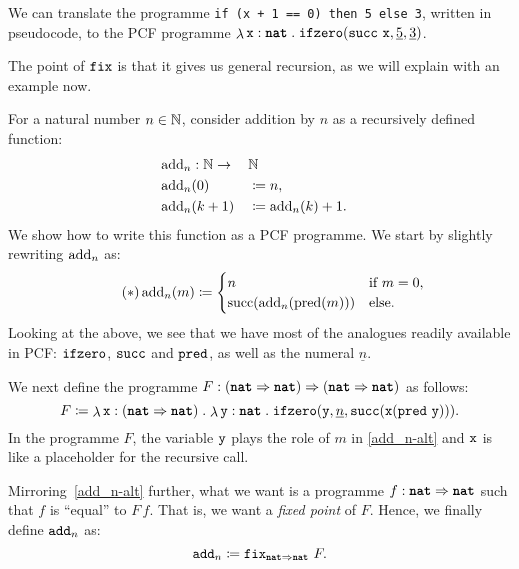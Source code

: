 \begin{example}\label{exam:ifzero}
  We can translate the programme \verb|if (x + 1 == 0) then 5 else 3|, written in
  pseudocode, to the PCF programme
  \(\lambdadot{\var x : \pcfnat}{\pcfifz(\pcfsuc \, \var x, \numeral 5, \numeral 3)}\).
\end{example}



The point of \(\pcffix\) is that it gives us general recursion, as we will
explain with an example now.

\begin{example}\label{exam:addition-by-n}
  For a natural number \(n \in \Nat\), consider addition by \(n\) as a
  recursively defined function:
  \begin{alignat*}{3}
    &\add_n : \Nat \to && \Nat && \\
    &\add_n(0) &&\coloneqq n, && \\
    &\add_n(k+1) &&\coloneqq \add_n(k) + 1. &&
  \end{alignat*}
  We show how to write this function as a PCF programme. We start by slightly
  rewriting \(\add_n\) as:
  \begin{equation*}\label{add_n-alt}\tag{\(\ast\)}
    \add_n(m) \coloneqq
    \begin{cases}
      n &\text{if } m = 0, \\
      \suc\pa*{\add_n(\pred(m))} &\text{else}.
    \end{cases}
  \end{equation*}
  Looking at the above, we see that we have most of the analogues readily
  available in PCF: \(\pcfifz\), \(\pcfsuc\) and \(\pcfpred\), as well as the
  numeral \(\underline n\).

  We next define the programme
  \(F : \pa*{\pcfnat \pcffun \pcfnat} \pcffun \pa*{\pcfnat \pcffun \pcfnat}\) as
  follows:
  \[
    F \coloneqq \lambdadot{\var x : \pa{\pcfnat \pcffun
        \pcfnat}}{\lambdadot{\var y : \pcfnat}%
      {\pcfifz\pa*{\var y,\numeral{n},%
          \pcfsuc\pa*{\var x\pa*{\pcfpred \, \var y }}}}}.
  \]
  In the programme \(F\), the variable \(\var y\) plays the role of \(m\) in
  \eqref{add_n-alt} and \(\var x\) is like a placeholder for the recursive call.

  Mirroring~\eqref{add_n-alt} further, what we want is a programme
  \(f : \pcfnat \pcffun \pcfnat\) such that \(f\) is ``equal'' to \(F\,f\). That
  is, we want a \emph{fixed point} of \(F\).
  Hence, we finally define \(\pcfadd_n\) as:
  \[
    \pcfadd_n \coloneqq \pcffix_{\pcfnat \pcffun \pcfnat} \, F.
  \]
\end{example}

